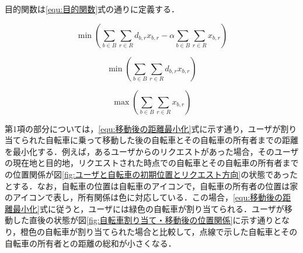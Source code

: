       \par 目的関数は\ref{equ:目的関数}式の通りに定義する．
      
      \begin{equation}\label{equ:目的関数}
        \min \left( \sum_{b \in B}\sum_{r \in R}d_{b,r}x_{b,r} - \alpha\sum_{b \in B}\sum_{r \in R}x_{b,r} \right)
      \end{equation}
      
      \begin{equation}\label{equ:移動後の距離最小化}
        \min \left( \sum_{b \in B}\sum_{r \in R}d_{b,r}x_{b,r} \right)
      \end{equation}
      
      \begin{equation}\label{equ:割り当て成功率最大化}
        \max \left(\sum_{b \in B}\sum_{r \in R}x_{b,r} \right)
      \end{equation}
      
      \par 第1項の部分については，\ref{equ:移動後の距離最小化}式に示す通り，ユーザが割り当てられた自転車に乗って移動した後の自転車とその自転車の所有者までの距離を最小化する．例えば，あるユーザからのリクエストがあった場合，そのユーザの現在地と目的地，リクエストされた時点での自転車とその自転車の所有者までの位置関係が図\ref{fig:ユーザと自転車の初期位置とリクエスト方向}の状態であったとする．なお，自転車の位置は自転車のアイコンで，自転車の所有者の位置は家のアイコンで表し，所有関係は色に対応している．この場合，\ref{equ:移動後の距離最小化}式に従うと，ユーザには緑色の自転車が割り当てられる．ユーザが移動した直後の状態が図\ref{fig:自転車割り当て・移動後の位置関係}に示す通りとなり，橙色の自転車が割り当てられた場合と比較して，点線で示した自転車とその自転車の所有者との距離の総和が小さくなる．
      
